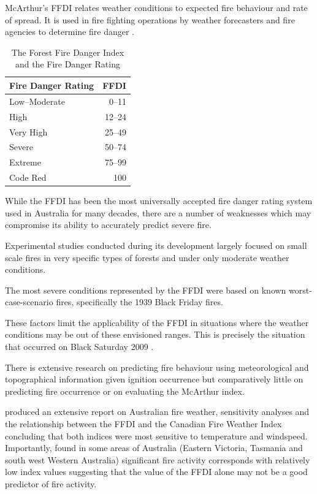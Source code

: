 \documentclass[11pt,a4paper]{article}
\begin{document}
McArthur's FFDI relates weather conditions to expected fire behaviour and rate of spread. It is used in fire fighting operations by weather forecasters and fire agencies to determine fire danger \citep{clarke2013}.

\begin{table}
  \centering
  \begin{tabular}{lr}
    \toprule
    Fire Danger Rating & FFDI \\
    \midrule
    Low--Moderate      & 0--11 \\
    High               & 12--24 \\
    Very High          & 25--49\\
    Severe             & 50--74\\
    Extreme            & 75--99 \\
    Code Red           & 100\rlap{+} \\
    \bottomrule
  \end{tabular}
  \caption{The Forest Fire Danger Index and the Fire Danger Rating}
  \label{table:FDR}
\end{table}

While the FFDI has been the most universally accepted fire danger rating system used in Australia for many decades, there are a number of weaknesses which may compromise its ability to accurately predict severe fire.
\begin{compactenum}
  \item Experimental studies conducted during its development largely focused on small scale fires in very specific types of forests and under only moderate weather conditions.
  \item The most severe conditions represented by the FFDI were based on known worst-case-scenario fires, specifically the 1939 Black Friday fires.
\end{compactenum}
These factors limit the applicability of the FFDI in situations where the weather conditions may be out of these envisioned ranges. This is precisely the situation that occurred on Black Saturday 2009 \citep{harris12}.

There is extensive research on predicting fire behaviour using meteorological and topographical information given ignition occurrence but comparatively little on  predicting fire occurrence or on evaluating the McArthur index.

\citet{dowdy10} produced an extensive report on Australian fire weather, sensitivity analyses and the relationship between the FFDI and the Canadian Fire Weather Index concluding that both indices were most sensitive to temperature and windspeed. Importantly, \citet{dowdy10} found in some areas of Australia (Eastern Victoria, Tasmania and south west Western Australia) significant fire activity corresponds with relatively low index values suggesting that the value of the FFDI alone may not be a good predictor of fire activity.
\end{document}
